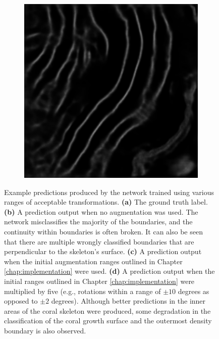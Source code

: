 \begin{figure}[!t]
\begin{subfigure}[t]{0.24\textwidth}
        \caption{}
    \end{subfigure}
    \begin{subfigure}[t]{0.24\textwidth}
        \centering
        \includegraphics[width=1\textwidth, valign=c]{images/aug-rotation.png}
        \caption{}
    \end{subfigure}
    \caption{Example predictions produced by the network trained using various ranges of acceptable transformations. \textbf{(a)} The ground truth label. \textbf{(b)} A prediction output when no augmentation was used. The network misclassifies the majority of the boundaries, and the continuity within boundaries is often broken. It can also be seen that there are multiple wrongly classified boundaries that are perpendicular to the skeleton's surface. \textbf{(c)} A prediction output when the initial augmentation ranges outlined in Chapter \ref{chap:implementation} were used. \textbf{(d)} A prediction output when the initial ranges outlined in Chapter \ref{chap:implementation} were multiplied by five (e.g., rotations within a range of $\pm 10$ degrees as opposed to $\pm 2$ degrees). Although better predictions in the inner areas of the coral skeleton were produced, some degradation in the classification of the coral growth surface and the outermost density boundary is also observed.}
    \label{fig:evalaugmentation}
\end{figure}

